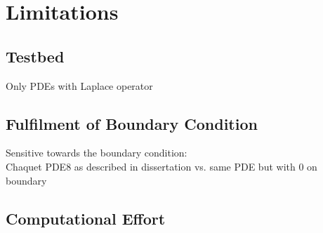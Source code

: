 \documentclass[./\jobname.tex]{subfiles}
\begin{document}
\chapter{Limitations}

\section{Testbed}
Only PDEs with Laplace operator

\section{Fulfilment of Boundary Condition}
Sensitive towards the boundary condition: \\
Chaquet PDE8 as described in dissertation vs. same PDE but with 0 on boundary

\section{Computational Effort}
\label{chap:computational_effort}

\begin{figure}[H]
	\centering
	\noindent{}
	\unterschrift{}{}{}
	\label{fig:ert_plot}
\end{figure}
\end{document}
